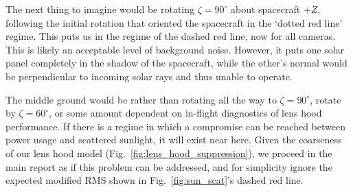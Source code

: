 The next thing to imagine would be rotating $\zeta=90^\circ$ about spacecraft 
$+Z$, 
following the initial rotation that oriented the spacecraft in the `dotted red 
line' regime.
This puts us in the regime of the dashed red line, now for all cameras.
This is likely an acceptable level of background noise.
However, it puts one solar panel completely in the shadow of the spacecraft, 
while the other's normal would be perpendicular to incoming solar rays and thus 
unable to operate.

The middle ground would be rather than rotating all the way to 
$\zeta=90^\circ$, rotate by $\zeta = 60^\circ$, or some amount dependent on 
in-flight diagnostics of \tesss lens hood performance.
If there is a regime in which a  compromise can be reached between
power usage and scattered sunlight, it will exist near here.
Given the coarseness of our lens hood model 
(Fig.~\ref{fig:lens_hood_suppression}), we proceed in the main report as if
this problem can be addressed, and for simplicity ignore the expected
modified RMS shown in Fig.~\ref{fig:sun_scat}'s dashed red line.


 

